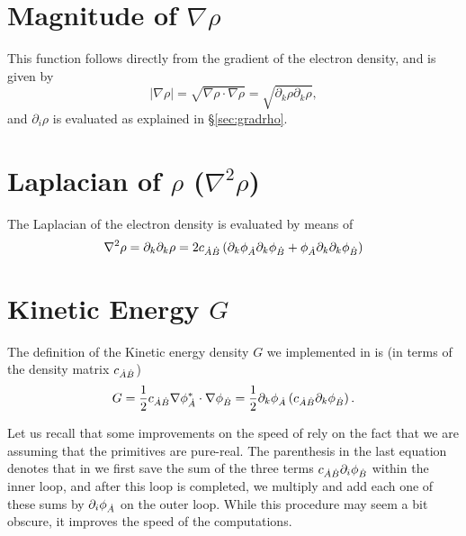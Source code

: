 \section{Magnitude of $\nabla\rho$}
This function follows directly from the gradient of the electron density, and is given by
%
\begin{equation}
   |\nabla\rho|=\sqrt{\nabla\rho\cdot\nabla\rho}=\sqrt{\partial_k\rho\partial_k\rho},
\end{equation}
%
and $\partial_i\rho$ is evaluated as explained in \S\ref{sec:gradrho}.
\section{Laplacian of $\rho$ ($\nabla^2\rho$)}

The Laplacian of the electron density is evaluated by means of
%
\begin{equation}
   \nabla^2\rho=\partial_k\partial_k\rho=2c_{\dot{A}\dot{B}}\left(\partial_k\phi_{\dot{A}}\partial_k\phi_{\dot{B}}+\phi_{\dot{A}}\partial_k\partial_k\phi_{\dot{B}}\right)
\end{equation}
%

\section{Kinetic Energy $G$}

The definition of the Kinetic energy density $G$ we implemented in \DTK{} is (in terms of the density matrix $c_{\dot{A}\dot{B}}$)
%
\begin{equation}
   G=\frac{1}{2}c_{\dot{A}\dot{B}}\nabla\phi_{\dot{A}}^*\cdot\nabla\phi_{\dot{B}}=\frac{1}{2}\partial_k\phi_{\dot{A}}\left(c_{\dot{A}\dot{B}}\partial_k\phi_{\dot{B}}\right).
\end{equation}
%

Let us recall that some improvements on the speed of \DTK{} rely on the fact that we are assuming that the primitives are pure-real. The parenthesis in the last equation denotes that in \DTK{} we first save the sum of the three terms $c_{\dot{A}\dot{B}}\partial_i\phi_{\dot{B}}$ within the inner loop, and after this loop is completed, we multiply and add each one of these sums by $\partial_i\phi_{\dot{A}}$ on the outer loop. While this procedure may seem a bit obscure, it improves the speed of the computations.


